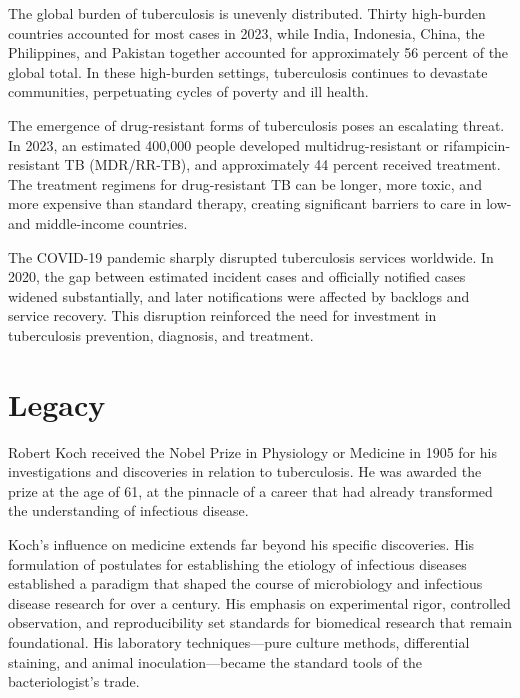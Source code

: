 The global burden of tuberculosis is unevenly distributed. Thirty high-burden countries accounted for most cases in 2023, while India, Indonesia, China, the Philippines, and Pakistan together accounted for approximately 56 percent of the global total. In these high-burden settings, tuberculosis continues to devastate communities, perpetuating cycles of poverty and ill health.\cite{who-tb}

The emergence of drug-resistant forms of tuberculosis poses an escalating threat. In 2023, an estimated 400,000 people developed multidrug-resistant or rifampicin-resistant TB (MDR/RR-TB), and approximately 44 percent received treatment. The treatment regimens for drug-resistant TB can be longer, more toxic, and more expensive than standard therapy, creating significant barriers to care in low- and middle-income countries.\cite{who-tb}

The COVID-19 pandemic sharply disrupted tuberculosis services worldwide. In 2020, the gap between estimated incident cases and officially notified cases widened substantially, and later notifications were affected by backlogs and service recovery. This disruption reinforced the need for investment in tuberculosis prevention, diagnosis, and treatment.\cite{who-tb}

\section{Legacy}

Robert Koch received the Nobel Prize in Physiology or Medicine in 1905 for his investigations and discoveries in relation to tuberculosis. He was awarded the prize at the age of 61, at the pinnacle of a career that had already transformed the understanding of infectious disease.

Koch's influence on medicine extends far beyond his specific discoveries. His formulation of postulates for establishing the etiology of infectious diseases established a paradigm that shaped the course of microbiology and infectious disease research for over a century. His emphasis on experimental rigor, controlled observation, and reproducibility set standards for biomedical research that remain foundational. His laboratory techniques---pure culture methods, differential staining, and animal inoculation---became the standard tools of the bacteriologist's trade.

